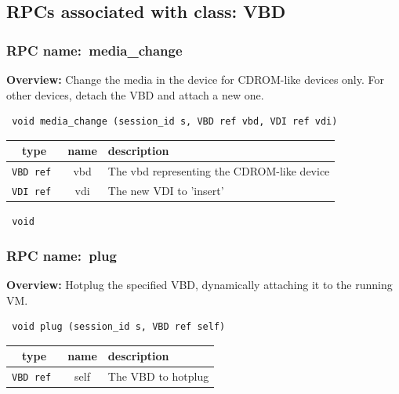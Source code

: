 \subsection{RPCs associated with class: VBD}
\subsubsection{RPC name:~media\_change}

{\bf Overview:} 
Change the media in the device for CDROM-like devices only. For other
devices, detach the VBD and attach a new one.

\begin{verbatim} void media_change (session_id s, VBD ref vbd, VDI ref vdi)\end{verbatim}



 
\vspace{0.3cm}
\begin{tabular}{|c|c|p{7cm}|}
 \hline
{\bf type} & {\bf name} & {\bf description} \\ \hline
{\tt VBD ref } & vbd & The vbd representing the CDROM-like device \\ \hline 

{\tt VDI ref } & vdi & The new VDI to 'insert' \\ \hline 

\end{tabular}

\vspace{0.3cm}

{\tt 
void
}



\vspace{0.3cm}
\vspace{0.3cm}
\vspace{0.3cm}
\subsubsection{RPC name:~plug}

{\bf Overview:} 
Hotplug the specified VBD, dynamically attaching it to the running VM.

\begin{verbatim} void plug (session_id s, VBD ref self)\end{verbatim}



 
\vspace{0.3cm}
\begin{tabular}{|c|c|p{7cm}|}
 \hline
{\bf type} & {\bf name} & {\bf description} \\ \hline
{\tt VBD ref } & self & The VBD to hotplug \\ \hline 

\end{tabular}

